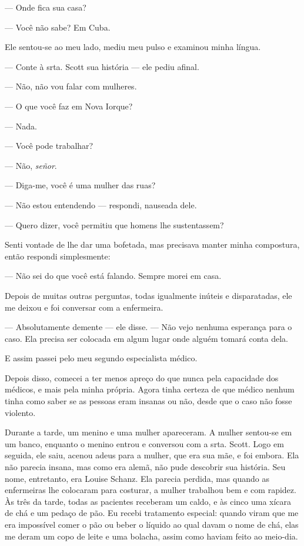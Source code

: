 --- Onde fica sua casa?

--- Você não sabe? Em Cuba.


Ele sentou-se ao meu lado, mediu meu pulso e examinou minha língua.

--- Conte à srta. Scott sua história --- ele pediu afinal.

--- Não, não vou falar com mulheres.

--- O que você faz em Nova Iorque?

--- Nada.

--- Você pode trabalhar?

--- Não, \emph{señor}.

--- Diga-me, você é uma mulher das ruas?

--- Não estou entendendo --- respondi, nauseada dele.

--- Quero dizer, você permitiu que homens lhe sustentassem?

Senti vontade de lhe dar uma bofetada, mas precisava manter minha
compostura, então respondi simplesmente:

--- Não sei do que você está falando. Sempre morei em casa.

Depois de muitas outras perguntas, todas igualmente inúteis e
disparatadas, ele me deixou e foi conversar com a enfermeira. 

--- Absolutamente demente --- ele disse. --- Não vejo nenhuma esperança para
o caso. Ela precisa ser colocada em algum lugar onde alguém tomará conta
dela.

E assim passei pelo meu segundo especialista médico.

Depois disso, comecei a ter menos apreço do que nunca pela capacidade
dos médicos, e mais pela minha própria. Agora tinha certeza de que
médico nenhum tinha como saber se as pessoas eram insanas ou não, desde
que o caso não fosse violento.

Durante a tarde, um menino e uma mulher apareceram. A mulher sentou-se
em um banco, enquanto o menino entrou e conversou com a srta. Scott.
Logo em seguida, ele saiu, acenou adeus para a mulher, que era sua mãe,
e foi embora. Ela não parecia insana, mas como era alemã, não pude
descobrir sua história. Seu nome, entretanto, era Louise Schanz. Ela
parecia perdida, mas quando as enfermeiras lhe colocaram para costurar,
a mulher trabalhou bem e com rapidez. Às três da tarde, todas as
pacientes receberam um caldo, e às cinco uma xícara de chá e um pedaço
de pão. Eu recebi tratamento especial: quando viram que me era
impossível comer o pão ou beber o líquido ao qual davam o nome de chá,
elas me deram um copo de leite e uma bolacha, assim como haviam feito ao
meio-dia.

